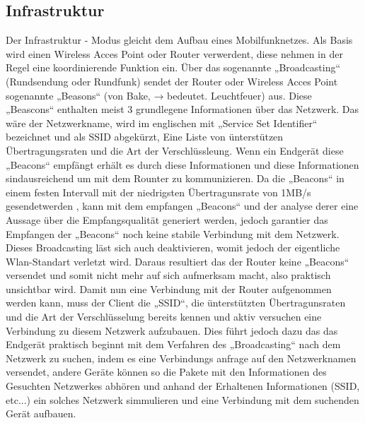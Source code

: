 \documentclass[a4paper,13pt]{scrartcl}
\begin{document}
\subsection{Infrastruktur}
Der Infrastruktur - Modus gleicht dem Aufbau eines Mobilfunknetzes. Als Basis wird einen Wireless Acces Point oder Router verwerdent, diese nehmen in der Regel eine koordinierende Funktion ein. Über das sogenannte „Broadcasting“ (Rundsendung oder Rundfunk) sendet der Router oder Wireless Acces Point sogenannte „Beasons“ (von Bake, → bedeutet. Leuchtfeuer) aus. Diese „Beascons“ enthalten meist 3 grundlegene Informationen über das Netzwerk. Das wäre der Netzwerkname, wird im englischen mit „Service Set Identifier“ bezeichnet und als SSID abgekürzt,  Eine Liste von ünterstützen Übertragungsraten und die Art der Verschlüssleung. Wenn ein Endgerät diese „Beacons“ empfängt erhält es durch diese Informationen und diese Informationen sindausreichend um mit dem Rounter zu kommunizieren. Da die „Beacons“ in einem festen Intervall mit der niedrigsten Übertragunsrate von 1MB/s gesendetwerden , kann mit dem empfangen „Beacons“ und der analyse derer eine Aussage über die Empfangsqualität generiert werden, jedoch garantier das Empfangen der „Beacons“ noch keine stabile Verbindung mit dem Netzwerk. Dieses Broadcasting läst sich auch deaktivieren, womit jedoch der eigentliche Wlan-Standart verletzt wird. Daraus resultiert das der Router keine „Beacons“ versendet und somit nicht mehr auf sich aufmerksam macht, also praktisch unsichtbar wird. Damit nun eine Verbindung mit der Router aufgenommen werden kann, muss der Client die „SSID“, die ünterstützten Übertragunsraten und die Art der Verschlüsselung bereits kennen und aktiv versuchen eine Verbindung zu diesem Netzwerk aufzubauen. Dies führt jedoch dazu das das Endgerät praktisch beginnt mit dem Verfahren des „Broadcasting“ nach dem Netzwerk zu suchen, indem es eine Verbindungs anfrage auf den Netzwerknamen versendet, andere Geräte können so die Pakete mit den Informationen des Gesuchten Netzwerkes abhören und anhand der Erhaltenen Informationen (SSID, etc...) ein solches Netzwerk simmulieren und eine Verbindung mit dem suchenden Gerät aufbauen. 
\end{document}

